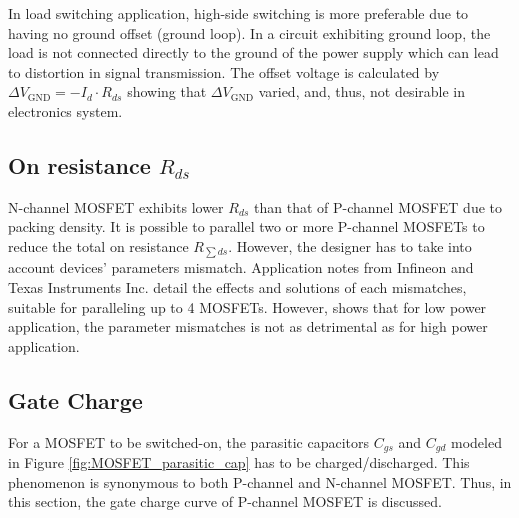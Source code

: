 \documentclass[../main.tex]{subfiles}
\begin{document}
    \justify
    In load switching application, high-side switching is more preferable due to having no ground offset (ground loop). In a circuit exhibiting ground loop, the load is not connected directly to the ground of the power supply which can lead to distortion in signal transmission. The offset voltage is calculated by $\Delta V_\text{GND} = -I_d \cdot R_{ds}$ showing that $\Delta V_\text{GND}$ varied, and, thus, not desirable in electronics system.    

    \pagebreak
    \subsection{On resistance $R_{ds}$} \label{ssec:on_resistance}
    N-channel MOSFET exhibits lower $R_{ds}$ than that of P-channel MOSFET due to packing density. It is possible to parallel two or more P-channel MOSFETs to reduce the total on resistance $R_{\sum ds}$. However, the designer has to take into account devices' parameters mismatch. Application notes from Infineon and Texas Instruments Inc. \cite{InfineonParallelMOS} \cite{TIParallelMOS} detail the effects and solutions of each mismatches, suitable for paralleling up to 4 MOSFETs. However, \cite{MOSFET_parallel_low_power} shows that for low power application, the parameter mismatches is not as detrimental as for high power application.
    
    \pagebreak
    \subsection{Gate Charge} \label{ssec:gate_charge}

    \justify
    For a MOSFET to be switched-on, the parasitic capacitors $C_{gs}$ and $C_{gd}$ modeled in Figure \ref{fig:MOSFET_parasitic_cap} has to be charged/discharged. This phenomenon is synonymous to both P-channel and N-channel MOSFET. Thus, in this section, the gate charge curve of P-channel MOSFET is discussed.
\end{document}
